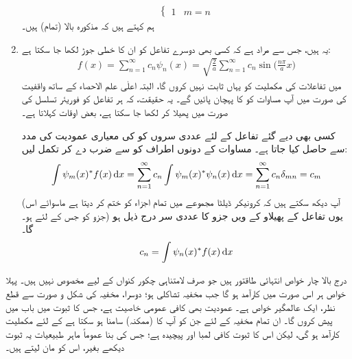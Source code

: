 \begin{enumerate}
\begin{align}
\begin{cases}
1 &  m=n
\end{cases}
\end{align} 
ہم کہتے ہیں کہ مذکورہ بالا (تمام)    ہیں۔ 
\item
 یہ  ہیں، جس سے مراد ہے کہ کسی  بھی دوسرے تفاعل  کو ان کا خطی جوڑ لکھا جا سکتا ہے:
\begin{align}\label{مساوات_شروڈنگر_کوئی_تفاعل}
f(x)=\sum_{n=1}^{\infty}c_{n}\psi_{n}(x)=\sqrt{\frac{2}{a}}\sum_{n=1}^{\infty}c_{n}\sin\big(\frac{n\pi}{a}x\big)
\end{align}
 میں تفاعلات    کی مکملیت کو یہاں ثابت نہیں کروں گا، البتہ  اعلٰی علم الاحصاء کے ساتھ واقفیت کی صورت میں آپ مساوات  کو  کا  پہچان پائیں گے۔ یہ حقیقت، کہ ہر تفاعل کو فوریئر تسلسل کی صورت میں پھیلا کر لکھا جا سکتا ہے، بعض اوقات  کہلاتا ہے۔

کسی بھی دیے گئے تفاعل  کے لئے عددی سروں   کو   کی معیاری عمودیت کی مدد سے حاصل کیا جاتا ہے۔ مساوات  کے دونوں اطراف کو  سے ضرب دے کر تکمل لیں:
 \begin{align}
\int \psi_{m}(x)^*f(x)\dif{x}=\sum_{n=1}^{\infty}c_{n}\int\psi_{m}(x)^*\psi_{n}(x)\dif{x}=\sum_{n=1}^{\infty}c_{n}\delta_{mn}=c_{m}
\end{align}
(آپ دیکھ سکتے ہیں کہ کرونیکر ڈیلٹا مجموعے میں تمام اجزاء کو ختم کر دیتا ہے ماسوائے اس جزو کو جس کے لئے   ہو۔) یوں تفاعل    کے پھیلاو  کے  ویں جزو کا عددی سر درج ذیل ہو گا۔
\begin{align}\label{مساوات_شروڈنگر_عددی_سر}
c_{n}=\int\psi_{n}(x)^*f(x)\dif{x}
\end{align}
\end{enumerate}

درج بالا   چار خواص انتہائی طاقتور ہیں جو صرف لامتناہی چکور کنواں کے لیے مخصوص نہیں ہیں۔ پہلا خواص ہر اس صورت میں کارآمد ہو گا جب مخفیہ  تشاکلی ہو؛  دوسرا، مخفیہ  کی شکل و صورت سے قطع نظر، ایک عالمگیر خواص ہے۔ عمودیت بھی کافی  عمومی خاصیت ہے، جس کا ثبوت میں باب   میں پیش کروں گا۔  ان تمام مخفیہ کے لئے جن کو آپ کا (ممکنہ) سامنا ہو سکتا ہے کے لئے مکملیت  کارآمد ہو گی، لیکن اس کا ثبوت کافی لمبا اور  پیچیدہ ہے؛ جس کی بنا عموماً ماہر طبیعیات یہ ثبوت دیکھے بغیر، اس کو مان لیتے ہیں۔


